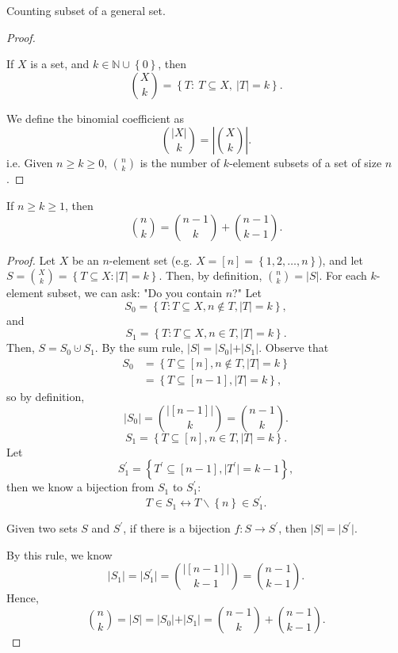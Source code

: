 \begin{eg}
  Counting subset of a general set. 
\end{eg}
\begin{proof}
\begin{notation}
  If \(X\) is a set, and \(k \in \mathbb{N} \cup \left\{ 0 \right\} \), then 
  \[
    \binom{X}{k} = \left\{ T: \ T \subseteq X, \ \vert T \vert = k  \right\}. 
  \] 
\end{notation}
We define the binomial coefficient as 
\[
  \binom{\vert X \vert }{k} = \left\vert \binom{X}{k} \right\vert. 
\]
i.e. Given \(n \ge k \ge 0\), \(\binom{n}{k}\) is the number of \(k\)-element subsets of a set of size \(n\).    
\end{proof}
\begin{proposition}
  If \(n \ge k \ge 1\), then 
  \[
    \binom{n}{k} = \binom{n-1}{k} + \binom{n-1}{k-1}.
  \] 
\end{proposition}
\begin{proof}
  Let \(X\) be an \(n\)-element set (e.g. \(X = [n] = \left\{ 1,2, \dots ,n \right\} \)), and let \(S=\binom{X}{k}=\left\{ T \subseteq X: \vert T \vert = k  \right\} \). Then, by definition, \(\binom{n}{k} = \vert S \vert \).  For each \(k\)-element subset, we can ask: "Do you contain \(n\)?" Let
  \[
    S_0 = \left\{ T: T \subseteq X, n \notin T, \vert T \vert = k  \right\},
  \]   and 
  \[
    S_1 = \left\{ T: T \subseteq X, n \in T, \vert T \vert = k  \right\}. 
  \]
  Then, \(S = S_0 \cupdot S_1\). By the sum rule, \(\vert S \vert = \vert S_0 \vert + \vert S_1 \vert   \).  Observe that 
  \begin{align*}
    S_0 &= \left\{ T \subseteq [n], n \notin T, \vert T \vert = k  \right\} \\
    &= \left\{ T \subseteq [n-1], \vert T \vert = k  \right\} ,
  \end{align*} 
  so by definition, 
  \[
    \vert S_0 \vert  = \binom{\vert [n-1] \vert }{k}=\binom{n-1}{k}.
  \]
  \[
    S_1 = \left\{ T \subseteq [n], n \in T, \vert T \vert = k  \right\}. 
  \]
  Let
  \[
    S_1^{\prime} = \left\{ T^{\prime}  \subseteq [n-1], \vert T^{\prime}  \vert = k-1 \right\}, 
  \] then we know a bijection from \(S_1\) to \(S_1^{\prime} \): 
  \[
    T \in S_1 \longleftrightarrow T\backslash \left\{ n \right\} \in S_1^{\prime}.
  \]  
  \begin{theorem}
    Given two sets \(S\) and \(S^{\prime} \), if there is a bijection \(f: S \to S^{\prime} \), then \(\vert S \vert = \vert S^{\prime}  \vert \).    
  \end{theorem}
  By this rule, we know 
  \[
    \vert S_1 \vert = \vert S_1^{\prime}  \vert = \binom{\vert [n-1] \vert }{k-1}= \binom{n-1}{k-1}.  
  \]
  Hence, 
  \[
    \binom{n}{k} = \vert S \vert = \vert S_0 \vert + \vert S_1 \vert = \binom{n-1}{k} + \binom{n-1}{k-1}.  
  \]
\end{proof}
